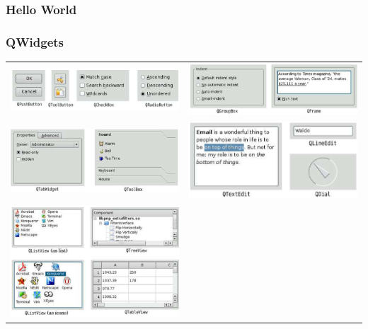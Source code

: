 \subsubsection{Hello World}

\subsubsection{QWidgets}
\begin{tabular}{c c}
	\includegraphics[width=9cm]{images/button_1.png}& \includegraphics[width=9cm]{images/button_2.png}\\
	\includegraphics[width=9cm]{images/button_3.png}& \includegraphics[width=9cm]{images/button_7.png}\\
	\includegraphics[width=9cm]{images/button_4.png}&

\end{tabular}
